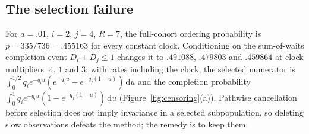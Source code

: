 \documentclass[11pt,a4paper]{article}
\theoremstyle{plain}
\theoremstyle{definition}
\theoremstyle{remark}
\newcommand{\dd}{\,\mathrm d}
\begin{document}
\subsection{The selection failure}\label{sec:selection}
For $a=.01$, $i=2$, $j=4$, $R=7$, the full-cohort ordering probability is $p=335/736=.455163$ for every constant clock. Conditioning on the sum-of-waits completion event $D_i+D_j\le1$ changes it to $.491088$, $.479803$ and $.459864$ at clock multipliers $.4$, $1$ and $3$: with rates including the clock, the selected numerator is $\int_0^{1/2}q_ie^{-q_iu}(e^{-q_ju}-e^{-q_j(1-u)})\dd u$ and the completion probability $\int_0^1q_ie^{-q_iu}(1-e^{-q_j(1-u)})\dd u$ (Figure~\ref{fig:censoring}(a)). Pathwise cancellation before selection does not imply invariance in a selected subpopulation, so deleting slow observations defeats the method; the remedy is to keep them.
\end{document}
